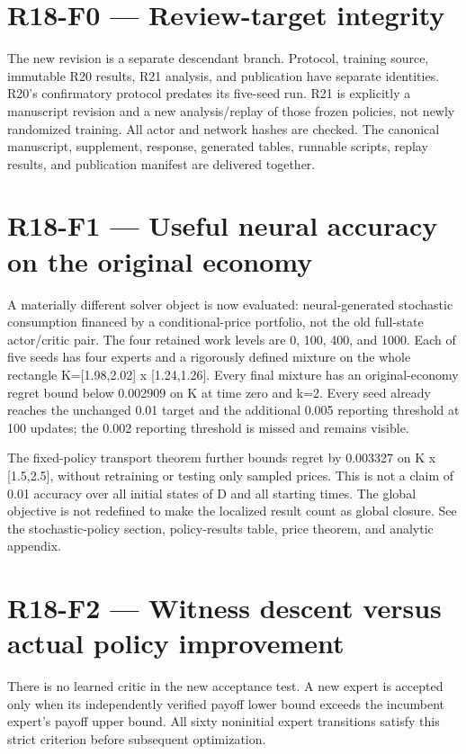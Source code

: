 \documentclass[ecta]{econsocart}
\theoremstyle{remark}
\begin{document}
\section{R18-F0 — Review-target integrity}
The new revision is a separate descendant branch. Protocol, training source, immutable R20 results, R21 analysis, and publication have separate identities. R20's confirmatory protocol predates its five-seed run. R21 is explicitly a manuscript revision and a new analysis/replay of those frozen policies, not newly randomized training. All actor and network hashes are checked. The canonical manuscript, supplement, response, generated tables, runnable scripts, replay results, and publication manifest are delivered together.

\section{R18-F1 — Useful neural accuracy on the original economy}
A materially different solver object is now evaluated: neural-generated stochastic consumption financed by a conditional-price portfolio, not the old full-state actor/critic pair. The four retained work levels are 0, 100, 400, and 1000. Each of five seeds has four experts and a rigorously defined mixture on the whole rectangle K=[1.98,2.02] x [1.24,1.26]. Every final mixture has an original-economy regret bound below 0.002909 on K at time zero and k=2. Every seed already reaches the unchanged 0.01 target and the additional 0.005 reporting threshold at 100 updates; the 0.002 reporting threshold is missed and remains visible.

The fixed-policy transport theorem further bounds regret by 0.003327 on K x [1.5,2.5], without retraining or testing only sampled prices. This is not a claim of 0.01 accuracy over all initial states of D and all starting times. The global objective is not redefined to make the localized result count as global closure. See the stochastic-policy section, policy-results table, price theorem, and analytic appendix.

\section{R18-F2 — Witness descent versus actual policy improvement}
There is no learned critic in the new acceptance test. A new expert is accepted only when its independently verified payoff lower bound exceeds the incumbent expert's payoff upper bound. All sixty noninitial expert transitions satisfy this strict criterion before subsequent optimization.
\end{document}
